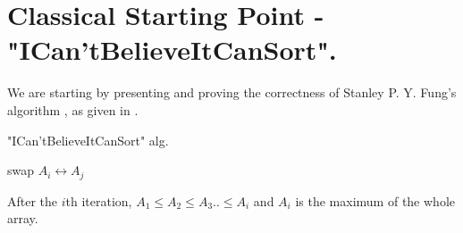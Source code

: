 \documentclass[manuscript,screen,review]{acmart}
\begin{document}
\section{ Classical Starting Point - "ICan'tBelieveItCanSort".}
We are starting by presenting and proving the correctness of Stanley P. Y. Fung's algorithm \cite{Simplesort}, as given in .
\begin{algorithm}
\SetAlgoLined
{}
\caption{ "ICan'tBelieveItCanSort"  alg.} \label{alg:alg1}
 {
   {
     {
      swap $A_{i} \leftrightarrow A_{j}$
    }
  }
}
\end{algorithm}
\begin{claim}
  \label{claim:first}
  After the $i$th iteration, $A_{1} \le A_{2} \le A_{3} .. \le A_{i}$ and $A_{i}$ is the maximum of the whole array. 
\end{claim}
\end{document}
